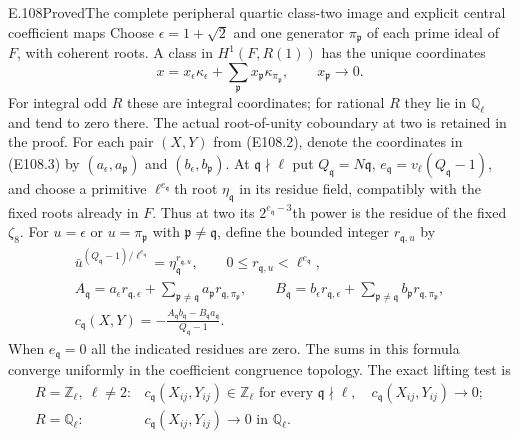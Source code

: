 \begin{statement}{E.108}{Proved}{The complete peripheral quartic class-two image and explicit central coefficient maps}
Choose $\epsilon=1+\sqrt2$ and one generator $\pi_{\mathfrak p}$
of each prime ideal of $F$, with coherent roots.  A class in
$H^1(F,R(1))$ has the unique coordinates
\[
 x=x_\epsilon\kappa_\epsilon+
                 \sum_{\mathfrak p}x_{\mathfrak p}\kappa_{\pi_{\mathfrak p}},
 \qquad x_{\mathfrak p}\longrightarrow0.
 \tag{E108.3}
\]
For integral odd $R$ these are integral coordinates; for rational
$R$ they lie in $\mathbb Q_\ell$ and tend to zero there.  The
actual root-of-unity coboundary at two is retained in the proof.
For each pair $(X,Y)$ from (E108.2), denote the coordinates in
(E108.3) by $(a_\epsilon,a_{\mathfrak p})$ and
$(b_\epsilon,b_{\mathfrak p})$.
At $\mathfrak q\nmid\ell$ put $Q_{\mathfrak q}=N\mathfrak q$,
$e_{\mathfrak q}=v_\ell(Q_{\mathfrak q}-1)$, and choose a primitive
$\ell^{e_{\mathfrak q}}$th root $\eta_{\mathfrak q}$ in its
residue field, compatibly with the fixed roots already in $F$.
Thus at two its $2^{e_{\mathfrak q}-3}$th power is the residue
of the fixed $\zeta_8$.  For $u=\epsilon$ or $u=\pi_{\mathfrak p}$ with
$\mathfrak p\ne\mathfrak q$, define the bounded integer
$r_{\mathfrak q,u}$ by
\[
 \begin{gathered}
 \bar u^{(Q_{\mathfrak q}-1)/\ell^{e_{\mathfrak q}}}
       =\eta_{\mathfrak q}^{r_{\mathfrak q,u}},\qquad
       0\le r_{\mathfrak q,u}<\ell^{e_{\mathfrak q}},\\
 A_{\mathfrak q}=a_\epsilon r_{\mathfrak q,\epsilon}
        +\sum_{\mathfrak p\ne\mathfrak q}
                  a_{\mathfrak p}r_{\mathfrak q,\pi_{\mathfrak p}},\qquad
 B_{\mathfrak q}=b_\epsilon r_{\mathfrak q,\epsilon}
        +\sum_{\mathfrak p\ne\mathfrak q}
                  b_{\mathfrak p}r_{\mathfrak q,\pi_{\mathfrak p}},\\
 c_{\mathfrak q}(X,Y)=
       -\frac{A_{\mathfrak q}b_{\mathfrak q}
                      -B_{\mathfrak q}a_{\mathfrak q}}
                    {Q_{\mathfrak q}-1}.
 \end{gathered}
 \tag{E108.4}
\]
When $e_{\mathfrak q}=0$ all the indicated residues are zero.
The sums in this formula converge uniformly in the coefficient
congruence topology.  The exact lifting test is
\[
 \begin{array}{ll}
 R=\mathbb Z_\ell,\ \ell\ne2:
   &c_{\mathfrak q}(X_{ij},Y_{ij})\in\mathbb Z_\ell
       \text{ for every }\mathfrak q\nmid\ell,
       \quad c_{\mathfrak q}(X_{ij},Y_{ij})\longrightarrow0;\\[2pt]
 R=\mathbb Q_\ell:
   &c_{\mathfrak q}(X_{ij},Y_{ij})\longrightarrow0
                                      \text{ in }\mathbb Q_\ell.

\end{array}\]
\end{statement}
